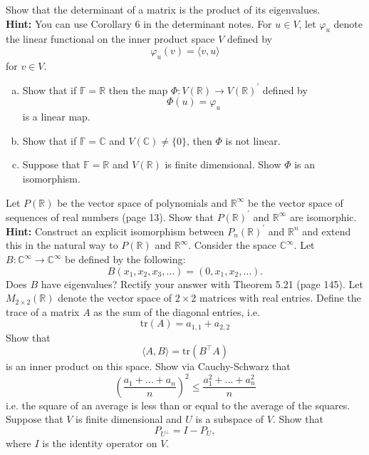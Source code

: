 \documentclass[11pt]{exam}
\theoremstyle{definition}
\newcommand{\tr}{\text{tr}}
\begin{document}
\begin{questions}
\question Show that the determinant of a matrix is the product of its eigenvalues.\vspace{-.1in}\\

{\bf Hint: }You can use Corollary 6 in the determinant notes. 
\vfill
\question For $u\in V$, let $\varphi_u$ denote the linear functional on the inner product space $V$ defined by 
\[\varphi_u(v)=\langle v,u\rangle\] 
for $v\in V$. 
\begin{enumerate}[(a)]
\item Show that if $\mathbb{F}=\mathbb{R}$ then the map $\Phi: V(\mathbb{R})\rightarrow V(\mathbb{R})^\prime$ defined by 
\[\Phi(u)=\varphi_u\]
is a linear map. 
\item Show that if $\mathbb{F}=\mathbb{C}$ and $V(\mathbb{C})\neq \{0\}$, then $\Phi$ is not linear. 
\item Suppose that $\mathbb{F}=\mathbb{R}$ and $V(\mathbb{R})$ is finite dimensional. Show $\Phi$ is an isomorphism. 
\end{enumerate}
\vfill
\question Let $P(\mathbb{R})$ be the vector space of polynomials and $\mathbb{R}^\infty$ be the vector space of sequences of real numbers (page 13). Show that $P(\mathbb{R})^\prime$ and $\mathbb{R}^\infty$ are isomorphic. \vspace{-.1in}\\

{\bf Hint: }Construct an explicit isomorphism between $P_n(\mathbb{R})^\prime$ and $\mathbb{R}^n$ and extend this in the natural way to $P(\mathbb{R})$ and $\mathbb{R}^\infty$. 
\vfill
\question Consider the space $\mathbb{C}^\infty$. Let $B:\mathbb{C}^\infty\rightarrow \mathbb{C}^\infty$ be defined by the following:
\[B(x_1, x_2, x_3,\ldots) =(0, x_1, x_2, \ldots).\]
Does $B$ have eigenvalues? Rectify your answer with Theorem 5.21 (page 145).
\vfill
\question Let $M_{2\times 2}(\mathbb{R})$ denote the vector space of $2\times 2$ matrices with real entries.  Define the trace of a matrix $A$  as the sum of the diagonal entries, i.e. 
\[\tr(A)=a_{1,1}+a_{2,2}\]
Show that 
\[\langle A, B\rangle=\tr(B^\top A)\]
is an inner product on this space. 
\vfill
\question Show via Cauchy-Schwarz that 
\[\left(\frac{a_1+\ldots +a_n}{n}\right)^2\leq \frac{a_1^2+\ldots+a_n^2}{n}\]
i.e. the square of an average is less than or equal to the average of the squares. 
\question Suppose that $V$ is finite dimensional and $U$ is a subspace of $V$. Show that 
\[P_{U^\bot}=I-P_U,\]
where $I$ is the identity operator on $V$. 
\vfill
\end{questions}
\end{document}
